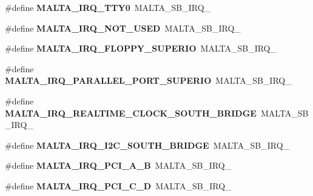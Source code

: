 \begin{DoxyCompactItemize}
\mbox{\label{group__bsp__interrupt_gadc7e6e6c6f0f31697006f21ac430bc56}} 
\#define {\bfseries M\+A\+L\+T\+A\+\_\+\+I\+R\+Q\+\_\+\+T\+T\+Y0}~M\+A\+L\+T\+A\+\_\+\+S\+B\+\_\+\+I\+R\+Q\+\_
\item 
\mbox{\label{group__bsp__interrupt_gab0199af84880a0987a407f5b5067a1fb}} 
\#define {\bfseries M\+A\+L\+T\+A\+\_\+\+I\+R\+Q\+\_\+\+N\+O\+T\+\_\+\+U\+S\+ED}~M\+A\+L\+T\+A\+\_\+\+S\+B\+\_\+\+I\+R\+Q\+\_
\item 
\mbox{\label{group__bsp__interrupt_gad0b451e6b97902b367e8f396de8184ce}} 
\#define {\bfseries M\+A\+L\+T\+A\+\_\+\+I\+R\+Q\+\_\+\+F\+L\+O\+P\+P\+Y\+\_\+\+S\+U\+P\+E\+R\+IO}~M\+A\+L\+T\+A\+\_\+\+S\+B\+\_\+\+I\+R\+Q\+\_
\item 
\mbox{\label{group__bsp__interrupt_ga0c95a588f6b69911733643835367eea6}} 
\#define {\bfseries M\+A\+L\+T\+A\+\_\+\+I\+R\+Q\+\_\+\+P\+A\+R\+A\+L\+L\+E\+L\+\_\+\+P\+O\+R\+T\+\_\+\+S\+U\+P\+E\+R\+IO}~M\+A\+L\+T\+A\+\_\+\+S\+B\+\_\+\+I\+R\+Q\+\_
\item 
\mbox{\label{group__bsp__interrupt_ga74cafbf286d8c2c75177c89a9496d4c4}} 
\#define {\bfseries M\+A\+L\+T\+A\+\_\+\+I\+R\+Q\+\_\+\+R\+E\+A\+L\+T\+I\+M\+E\+\_\+\+C\+L\+O\+C\+K\+\_\+\+S\+O\+U\+T\+H\+\_\+\+B\+R\+I\+D\+GE}~M\+A\+L\+T\+A\+\_\+\+S\+B\+\_\+\+I\+R\+Q\+\_
\item 
\mbox{\label{group__bsp__interrupt_ga431eaa75e84ab37baa7b5e92dbbadc2a}} 
\#define {\bfseries M\+A\+L\+T\+A\+\_\+\+I\+R\+Q\+\_\+\+I2\+C\+\_\+\+S\+O\+U\+T\+H\+\_\+\+B\+R\+I\+D\+GE}~M\+A\+L\+T\+A\+\_\+\+S\+B\+\_\+\+I\+R\+Q\+\_
\item 
\mbox{\label{group__bsp__interrupt_ga3301df6aa3b71ff0f5bf76ce3cf8f506}} 
\#define {\bfseries M\+A\+L\+T\+A\+\_\+\+I\+R\+Q\+\_\+\+P\+C\+I\+\_\+\+A\+\_\+B}~M\+A\+L\+T\+A\+\_\+\+S\+B\+\_\+\+I\+R\+Q\+\_
\item 
\mbox{\label{group__bsp__interrupt_ga20b3bed84169890052233c950cfee7d9}} 
\#define {\bfseries M\+A\+L\+T\+A\+\_\+\+I\+R\+Q\+\_\+\+P\+C\+I\+\_\+\+C\+\_\+D}~M\+A\+L\+T\+A\+\_\+\+S\+B\+\_\+\+I\+R\+Q\+\_

\end{DoxyCompactItemize}
